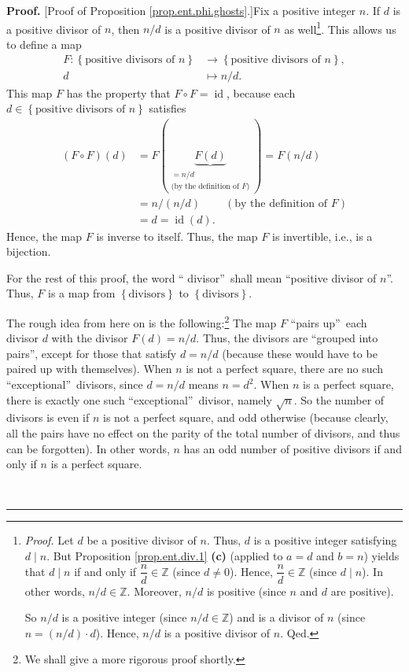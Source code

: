 \documentclass[numbers=enddot,12pt,final,onecolumn,notitlepage]{scrartcl}%
\numberwithin{exer}{subsection}
\theoremstyle{definition}
\newenvironment{proof}[1][Proof]{\noindent\textbf{#1.} }{\ \rule{0.5em}{0.5em}}
\begin{document}
\begin{proof}
[Proof of Proposition \ref{prop.ent.phi.ghosts}.]Fix a positive integer $n$.
If $d$ is a positive divisor of $n$, then $n/d$ is a positive divisor of $n$
as well\footnote{\textit{Proof.} Let $d$ be a positive divisor of $n$. Thus,
$d$ is a positive integer satisfying $d\mid n$. But Proposition
\ref{prop.ent.div.1} \textbf{(c)} (applied to $a=d$ and $b=n$) yields that
$d\mid n$ if and only if $\dfrac{n}{d}\in\mathbb{Z}$ (since $d\neq0$). Hence,
$\dfrac{n}{d}\in\mathbb{Z}$ (since $d\mid n$). In other words, $n/d\in
\mathbb{Z}$. Moreover, $n/d$ is positive (since $n$ and $d$ are positive).
\par
So $n/d$ is a positive integer (since $n/d\in\mathbb{Z}$) and is a divisor of
$n$ (since $n=\left(  n/d\right)  \cdot d$). Hence, $n/d$ is a positive
divisor of $n$. Qed.}. This allows us to define a map%
\begin{align*}
F:\left\{  \text{positive divisors of }n\right\}   &  \rightarrow\left\{
\text{positive divisors of }n\right\}  ,\\
d  &  \mapsto n/d.
\end{align*}
This map $F$ has the property that $F\circ F=\operatorname*{id}$, because each
$d\in\left\{  \text{positive divisors of }n\right\}  $ satisfies%
\begin{align*}
\left(  F\circ F\right)  \left(  d\right)   &  =F\left(  \underbrace{F\left(
d\right)  }_{\substack{=n/d\\\text{(by the definition of }F\text{)}}}\right)
=F\left(  n/d\right) \\
&  =n/\left(  n/d\right)  \ \ \ \ \ \ \ \ \ \ \left(  \text{by the definition
of }F\right) \\
&  =d=\operatorname*{id}\left(  d\right)  .
\end{align*}
Hence, the map $F$ is inverse to itself. Thus, the map $F$ is invertible,
i.e., is a bijection.

For the rest of this proof, the word \textquotedblleft
divisor\textquotedblright\ shall mean \textquotedblleft positive divisor of
$n$\textquotedblright. Thus, $F$ is a map from $\left\{  \text{divisors}%
\right\}  $ to $\left\{  \text{divisors}\right\}  $.

The rough idea from here on is the following:\footnote{We shall give a more
rigorous proof shortly.} The map $F$ \textquotedblleft pairs
up\textquotedblright\ each divisor $d$ with the divisor $F\left(  d\right)
=n/d$. Thus, the divisors are \textquotedblleft grouped into
pairs\textquotedblright, except for those that satisfy $d=n/d$ (because these
would have to be paired up with themselves). When $n$ is not a perfect square,
there are no such \textquotedblleft exceptional\textquotedblright\ divisors,
since $d=n/d$ means $n=d^{2}$. When $n$ is a perfect square, there is exactly
one such \textquotedblleft exceptional\textquotedblright\ divisor, namely
$\sqrt{n}$. So the number of divisors is even if $n$ is not a perfect square,
and odd otherwise (because clearly, all the pairs have no effect on the parity
of the total number of divisors, and thus can be forgotten). In other words,
$n$ has an odd number of positive divisors if and only if $n$ is a perfect square.


\end{proof}
\end{document}
